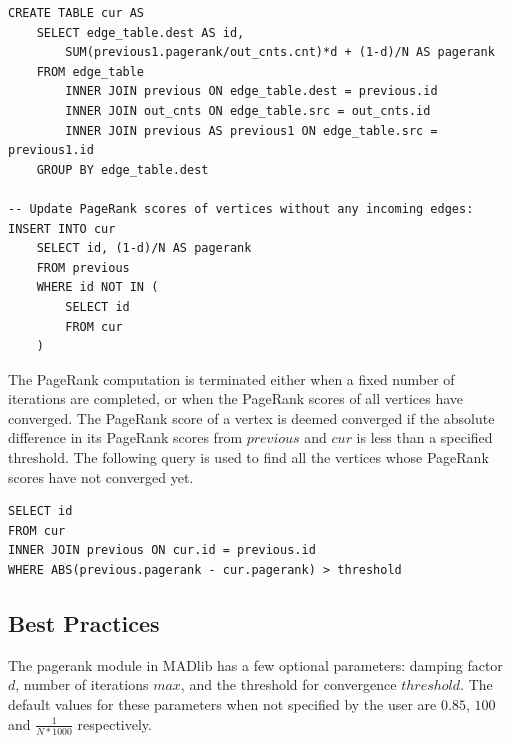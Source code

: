 \begin{algorithm}
\label{alg:pagerank:update}
\begin{lstlisting}
CREATE TABLE cur AS
    SELECT edge_table.dest AS id,
        SUM(previous1.pagerank/out_cnts.cnt)*d + (1-d)/N AS pagerank
    FROM edge_table
        INNER JOIN previous ON edge_table.dest = previous.id
        INNER JOIN out_cnts ON edge_table.src = out_cnts.id
        INNER JOIN previous AS previous1 ON edge_table.src = previous1.id
    GROUP BY edge_table.dest

-- Update PageRank scores of vertices without any incoming edges:
INSERT INTO cur
    SELECT id, (1-d)/N AS pagerank
    FROM previous
    WHERE id NOT IN (
        SELECT id
        FROM cur
    )
\end{lstlisting}
\end{algorithm}

The PageRank computation is terminated either when a fixed number of iterations
are completed, or when the PageRank scores of all vertices have converged. The
PageRank score of a vertex is deemed converged if the absolute difference in
its PageRank scores from $previous$ and $cur$ is less than a specified threshold.
The following query is used to find all the vertices whose PageRank scores have
not converged yet.

\begin{algorithm}
\label{alg:pagerank:update}
\begin{lstlisting}
SELECT id
FROM cur
INNER JOIN previous ON cur.id = previous.id
WHERE ABS(previous.pagerank - cur.pagerank) > threshold
\end{lstlisting}
\end{algorithm}

\subsection{Best Practices} \label{sec:pagerank:bestpractices}

The pagerank module in MADlib has a few optional parameters: damping factor
$d$, number of iterations $max$, and the threshold for convergence $threshold$.
The default values for these parameters when not specified by the user are
$0.85$, $100$ and $\frac{1}{N*1000}$ respectively.

